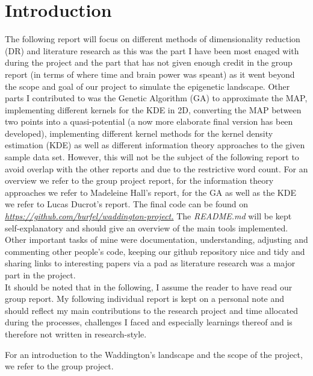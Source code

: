 \documentclass[journal, a4paper]{IEEEtran}
\begin{document}
\section{Introduction}
The following report will focus on different methods of dimensionality reduction (DR) and literature research as this was the part I have been most enaged with during the project and the part that has not given enough credit in the group report (in terms of where time and brain power was speant) as it went beyond the scope and goal of our project to simulate the epigenetic landscape.
Other parts I contributed to was the Genetic Algorithm (GA) to approximate the MAP, implementing different kernels for the KDE in 2D, converting the MAP between two points into a quasi-potential (a now more elaborate final version has been developed), implementing different kernel methods for the kernel density estimation (KDE) as well as different information theory approaches to the given sample data set. However, this will not be the subject of the following report to avoid overlap with the other reports and due to the restrictive word count. For an overview we refer to the group project report, for the information theory approaches we refer to Madeleine Hall's report, for the GA as well as the KDE we refer to Lucas Ducrot's report. The final code can be found on 
\textit{\url{https://github.com/burfel/waddington-project.}}
The \textit{README.md} will be kept self-explanatory and should give an overview of the main tools implemented. \\
Other important tasks of mine were documentation, understanding, adjusting and commenting other people's code, keeping our github repository nice and tidy and sharing links to interesting papers via a pad as literature research was a major part in the project. \\

It should be noted that in the following, I assume the reader to have read our group report. My following individual report is kept on a personal note and should reflect my main contributions to the research project and time allocated during the processes, challenges I faced and especially learnings thereof and is therefore not written in research-style. 

For an introduction to the Waddington's landscape and the scope of the project, we refer to the group project.
\end{document}
